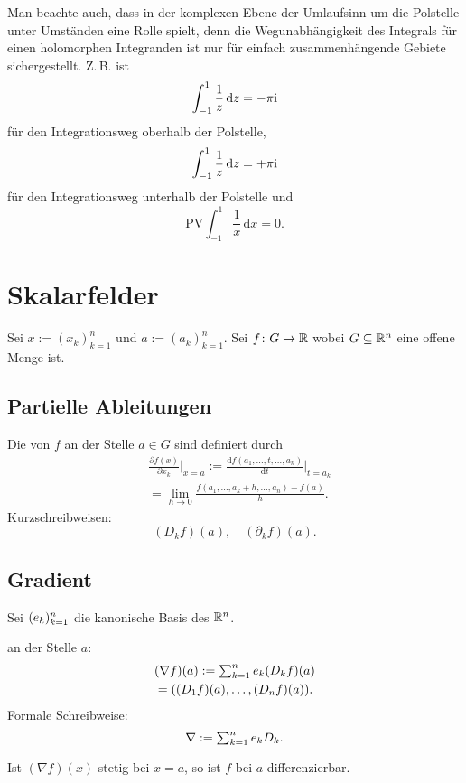 Man beachte auch, dass in der komplexen Ebene der Umlaufsinn um
die Polstelle unter Umständen eine Rolle spielt, denn die
Wegunabhängigkeit des Integrals für einen holomorphen Integranden
ist nur für einfach zusammenhängende Gebiete
sichergestellt. Z.\,B. ist
\begin{equation}
\int_{-1}^1 \frac{1}{z}\,\mathrm dz = -\pi\mathrm i
\end{equation}
für den Integrationsweg oberhalb der Polstelle,
\begin{equation}
\int_{-1}^1 \frac{1}{z}\,\mathrm dz = +\pi\mathrm i
\end{equation}
für den Integrationsweg unterhalb der Polstelle und
\begin{equation}
\mathrm{PV}\int_{-1}^1 \frac{1}{x}\,\mathrm dx = 0.
\end{equation}

\section{Skalarfelder}
Sei $x:=(x_k)_{k=1}^n$ und $a:=(a_k)_{k=1}^n$. Sei $f\colon G\to\mathbb R$
wobei $G\subseteq\mathbb R^n$ eine offene Menge ist.
\subsection{Partielle Ableitungen}
\begin{Definition}
Die 
von $f$ an der Stelle $a\in G$ sind definiert durch
\begin{equation}
\begin{split}
&\frac{\partial f(x)}{\partial x_k}\bigg|_{x=a}
:= \frac{\mathrm df(a_1,\ldots,t,\ldots,a_n)}{\mathrm dt}\bigg|_{t=a_k}\\
&= \lim_{h\to 0}\frac{f(a_1,\ldots,a_k+h,\ldots,a_n)-f(a)}{h}.
\end{split}
\end{equation}
Kurzschreibweisen:
\begin{equation}
(D_k f)(a),\quad (\partial_k f)(a).
\end{equation}
\end{Definition}
\subsection{Gradient}
Sei $(e_k)_{k=1}^n$ die kanonische Basis des $\mathbb R^n$.
\begin{Definition}  an der Stelle $a$:
\begin{equation}
\begin{split}
&(\nabla f)(a) := \textstyle\sum_{k=1}^n e_k (D_k f)(a)\\
&= ((D_1 f)(a),\ldots,(D_n f)(a)).
\end{split}
\end{equation}
Formale Schreibweise:
\begin{equation}
\nabla := \textstyle\sum_{k=1}^n e_k D_k.
\end{equation}
\end{Definition}
\noindent
Ist $(\nabla f)(x)$ stetig bei $x=a$, so
ist $f$ bei $a$ differenzierbar.

